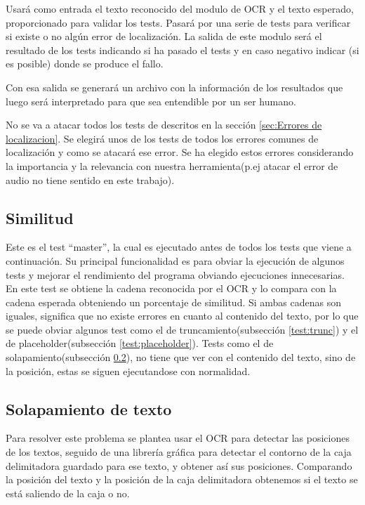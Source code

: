 Usará como entrada el texto reconocido del modulo de OCR y el texto esperado, proporcionado para validar los tests. Pasará por una serie de tests para verificar si existe o no algún error de localización. La salida de este modulo será el resultado de los tests indicando si ha pasado el tests y en caso negativo indicar (si es posible) donde se produce el fallo.

Con esa salida se generará un archivo con la información de los resultados que luego será interpretado para que sea entendible por un ser humano.

No se va a atacar todos los tests de descritos en la sección \ref{sec:Errores de localizacion}. 
Se elegirá unos de los tests de todos los errores comunes de localización y como se atacará ese error. Se ha elegido estos errores considerando la importancia y la relevancia con nuestra herramienta(p.ej atacar el error de audio no tiene sentido en este trabajo).
\subsection{Similitud}
\label{test:Simi}
Este es el test ``master'', la cual es ejecutado antes de todos los tests que viene a continuación. Su principal funcionalidad es para obviar la ejecución de algunos tests y mejorar el rendimiento del programa obviando ejecuciones innecesarias. En este test se obtiene la cadena reconocida por el OCR y lo compara con la cadena esperada obteniendo un porcentaje de similitud. Si ambas cadenas son iguales, significa que no existe errores en cuanto al contenido del texto, por lo que se puede obviar algunos test como el de truncamiento(subsección \ref{test:trunc}) y el de placeholder(subsección \ref{test:placeholder}). Tests como el de solapamiento(subsección \ref{test:overlap}), no tiene que ver con el contenido del texto, sino de la posición, estas se siguen ejecutandose con normalidad.

\subsection{Solapamiento de texto}
\label{test:overlap}
Para resolver este problema se plantea usar el OCR para detectar las posiciones de los textos, seguido de una librería gráfica para detectar el contorno de la caja delimitadora guardado para ese texto, y obtener así sus posiciones. Comparando la posición del texto y la posición de la caja delimitadora obtenemos si el texto se está saliendo de la caja o no.

